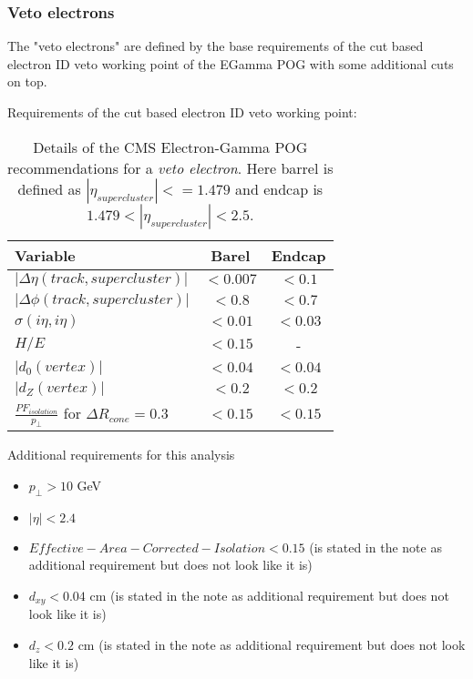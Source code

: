 \subsubsection{Veto electrons}

The "veto electrons" are defined by the base requirements of the cut based electron ID veto working point of the EGamma POG with some additional cuts on top. 
  
Requirements of the cut based electron ID veto working point:
 
\begin{table}[htp]
  
\begin{tabular}{|l|c|c|}
\hline
Variable & Barel & Endcap \\
\hline\hline
$| \Delta\eta(track,supercluster) |$ & $<0.007$ & $<0.1$  \\
$| \Delta\phi(track,supercluster) |$ & $<0.8  $ & $<0.7$  \\
$ \sigma(i\eta,i\eta)$               & $<0.01 $ & $<0.03$ \\
$H/E$                                & $<0.15 $ &       - \\
$|d_{0}(vertex)|$                    & $<0.04 $ & $<0.04$ \\
$|d_{Z}(vertex)|$                    & $<0.2  $ & $<0.2 $ \\
$\frac{PF_{isolation}}{p_{\perp}}$ for $ \Delta R_{cone}=0.3$  & $<0.15 $ & $<0.15$ \\
\hline
\end{tabular}
\caption{Details of the \gls{CMS} Electron-Gamma \gls{POG} recommendations for a \textit{veto electron}. Here barrel is defined as $ |\eta_{supercluster}|<=1.479 $ and endcap is $ 1.479 < |\eta_{supercluster}| < 2.5 $.} 
\end{table}

 
 
Additional requirements for this analysis
\begin{itemize}
  \item $ p_{\perp} > 10 $ GeV
  \item $ |\eta| < 2.4 $
  \item $ Effective-Area-Corrected-Isolation < 0.15 $ (is stated in the note as additional requirement but does not look like it is)
  \item $d_{xy}<0.04$ cm (is stated in the note as additional requirement but does not look like it is)
  \item $d_{z} < 0.2 $ cm (is stated in the note as additional requirement but does not look like it is)
\end{itemize}
 

